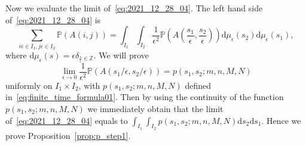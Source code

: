 \documentclass{article}
\numberwithin{equation}{section}
\newcommand{\intZ}{\mathbb{Z}}
\newcommand{\prob}{\mathbb{P}}
\begin{document}
Now we evaluate the limit of~\eqref{eq:2021_12_28_04}. The left hand side of~\eqref{eq:2021_12_28_04} is
\begin{equation}
	\sum_{i\epsilon\in I_1,j\epsilon\in I_2}\prob(A(i,j))=\int_{I_1}\int_{I_2} \frac{1}{\epsilon^2}\prob\left(A\left(\frac{s_1}{\epsilon},\frac{s_2}{\epsilon}\right)\right)\mathrm{d}\mu_\epsilon(s_2)\mathrm{d}\mu_\epsilon(s_1),
\end{equation}
where $\mathrm{d}\mu_\epsilon(s)=\epsilon\delta_{\frac{s}{\epsilon}\in\intZ}$. We will prove
\begin{equation}
	\label{eq:gDLPP_to_eDLPP}
	\lim_{\epsilon\to 0}\frac{1}{\epsilon^2}\prob(A(s_1/\epsilon,s_2/\epsilon))= p(s_1,s_2;m,n,M,N)
\end{equation}
uniformly on $I_1\times I_2$, with $p(s_1,s_2;m,n,M,N)$ defined in~\eqref{eq:finite_time_formula01}. Then by using the continuity of the function $p(s_1,s_2;m,n,M,N)$ we immediately obtain that the limit of~\eqref{eq:2021_12_28_04} equals to $\int_{I_1}\int_{I_2}p(s_1,s_2;m,n,M,N)\mathrm{d}s_2\mathrm{d}s_1$. Hence we prove Proposition~\ref{prop:p_step1}.
\end{document}
